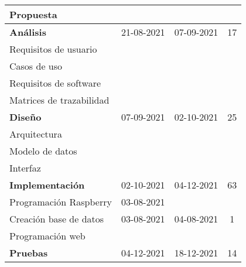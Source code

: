 \begin{longtable}[c]{lcc|c|}
	\multicolumn{1}{|l|}{Propuesta}                      & \multicolumn{1}{c|}{}           &                                     &     \\ \hline
	\multicolumn{1}{|l|}{\textbf{Análisis}}              & \multicolumn{1}{c|}{21-08-2021} & 07-09-2021                          & 17  \\ \hline
	\multicolumn{1}{|l|}{Requisitos de usuario}          & \multicolumn{1}{c|}{}           &                                     &     \\ \hline
	\multicolumn{1}{|l|}{Casos de uso}                   & \multicolumn{1}{c|}{}           &                                     &     \\ \hline
	\multicolumn{1}{|l|}{Requisitos de software}         & \multicolumn{1}{c|}{}           &                                     &     \\ \hline
	\multicolumn{1}{|l|}{Matrices de trazabilidad}       & \multicolumn{1}{c|}{}           &                                     &     \\ \hline
	\multicolumn{1}{|l|}{\textbf{Diseño}}                & \multicolumn{1}{c|}{07-09-2021} & 02-10-2021                          & 25  \\ \hline
	\multicolumn{1}{|l|}{Arquitectura}                   & \multicolumn{1}{c|}{}           &                                     &     \\ \hline
	\multicolumn{1}{|l|}{Modelo de datos}                & \multicolumn{1}{c|}{}           &                                     &     \\ \hline
	\multicolumn{1}{|l|}{Interfaz}                       & \multicolumn{1}{c|}{}           &                                     &     \\ \hline
	\multicolumn{1}{|l|}{\textbf{Implementación}}        & \multicolumn{1}{c|}{02-10-2021} & 04-12-2021                          & 63  \\ \hline
	\multicolumn{1}{|l|}{Programación Raspberry}         & \multicolumn{1}{c|}{03-08-2021} &                                     &     \\ \hline
	\multicolumn{1}{|l|}{Creación base de datos}         & \multicolumn{1}{c|}{03-08-2021} & 04-08-2021                          & 1   \\ \hline
	\multicolumn{1}{|l|}{Programación web}               & \multicolumn{1}{c|}{}           &                                     &     \\ \hline
	\multicolumn{1}{|l|}{\textbf{Pruebas}}               & \multicolumn{1}{c|}{04-12-2021} & 18-12-2021                          & 14  \\ \hline

\end{longtable}
